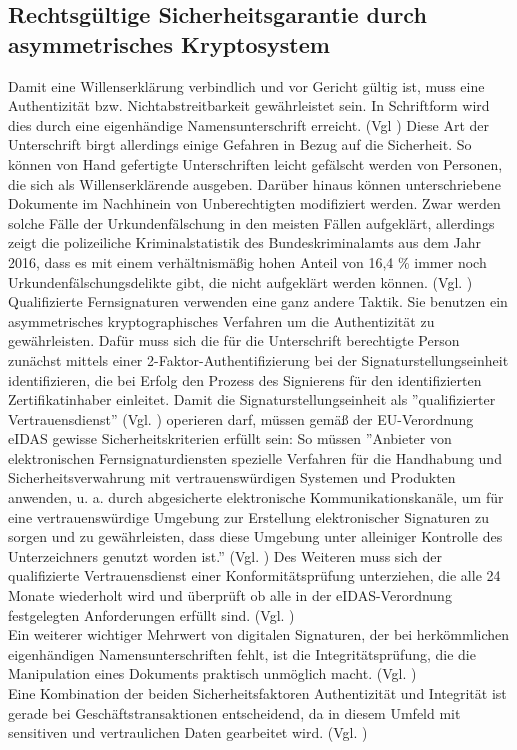 \documentclass[deutsch]{lib/llncs/llncs}
\begin{document}
\subsection{Rechtsgültige Sicherheitsgarantie durch asymmetrisches Kryptosystem}
Damit eine Willenserklärung verbindlich und vor Gericht gültig ist, muss eine Authentizität bzw. Nichtabstreitbarkeit gewährleistet sein. In Schriftform wird dies durch eine eigenhändige Namensunterschrift erreicht. (Vgl \cite[S. 5-6]{Zitat07}) Diese Art der Unterschrift birgt allerdings einige Gefahren in Bezug auf die Sicherheit. So können von Hand gefertigte Unterschriften leicht gefälscht werden von Personen, die sich als Willenserklärende ausgeben. Darüber hinaus können unterschriebene Dokumente im Nachhinein von Unberechtigten modifiziert werden. Zwar werden solche Fälle der Urkundenfälschung in den meisten Fällen aufgeklärt, allerdings zeigt die polizeiliche Kriminalstatistik des Bundeskriminalamts aus dem Jahr 2016, dass es mit einem verhältnismäßig hohen Anteil von 16,4 \% immer noch Urkundenfälschungsdelikte gibt, die nicht aufgeklärt werden können. (Vgl. \cite[S. 34]{Zitat10})\\
Qualifizierte Fernsignaturen verwenden eine ganz andere Taktik. Sie benutzen ein asymmetrisches kryptographisches Verfahren um die Authentizität zu gewährleisten. Dafür muss sich die für die Unterschrift berechtigte Person zunächst mittels einer 2-Faktor-Authentifizierung bei der Signaturstellungseinheit identifizieren, die bei Erfolg den Prozess des Signierens für den identifizierten Zertifikatinhaber einleitet. Damit die Signaturstellungseinheit als ''qualifizierter Vertrauensdienst'' (Vgl. \cite[S. 30]{Zitat08}) operieren darf, müssen gemäß der EU-Verordnung eIDAS gewisse Sicherheitskriterien erfüllt sein: So müssen ''Anbieter von elektronischen Fernsignaturdiensten spezielle Verfahren für die Handhabung und Sicherheitsverwahrung mit vertrauenswürdigen Systemen und Produkten anwenden, u. a. durch abgesicherte elektronische Kommunikationskanäle, um für eine vertrauenswürdige Umgebung zur Erstellung elektronischer Signaturen zu sorgen und zu gewährleisten, dass diese Umgebung unter alleiniger Kontrolle des Unterzeichners genutzt worden ist.'' (Vgl. \cite[S. 233]{Zitat09}) Des Weiteren muss sich der qualifizierte Vertrauensdienst einer Konformitätsprüfung unterziehen, die alle 24 Monate wiederholt wird und überprüft ob alle in der eIDAS-Verordnung festgelegten Anforderungen erfüllt sind. (Vgl. \cite[S. 30]{Zitat08}) \\
Ein weiterer wichtiger Mehrwert von digitalen Signaturen, der bei herkömmlichen eigenhändigen Namensunterschriften fehlt, ist die Integritätsprüfung, die die Manipulation eines Dokuments praktisch unmöglich macht. (Vgl. \cite[S. 7]{Zitat05}) \\
Eine Kombination der beiden Sicherheitsfaktoren Authentizität und Integrität ist gerade bei Geschäftstransaktionen entscheidend, da in diesem Umfeld mit sensitiven und vertraulichen Daten gearbeitet wird. (Vgl. \cite[S. 7]{Zitat05})
\end{document}
